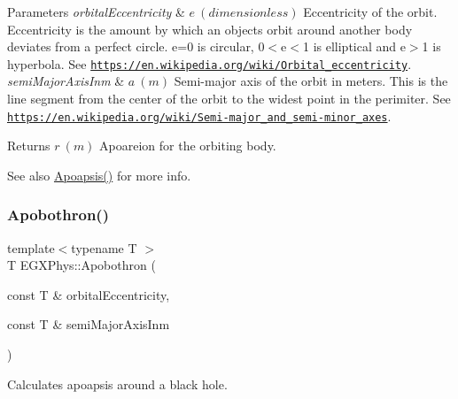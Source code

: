 \begin{DoxyParams}{Parameters}
{\em orbital\+Eccentricity} & $ e\ (dimensionless)$ Eccentricity of the orbit. Eccentricity is the amount by which an objects orbit around another body deviates from a perfect circle. e=0 is circular, 0$<$e$<$1 is elliptical and e$>$1 is hyperbola. See \href{https://en.wikipedia.org/wiki/Orbital_eccentricity}{\tt https\+://en.\+wikipedia.\+org/wiki/\+Orbital\+\_\+eccentricity}. \\
\hline
{\em semi\+Major\+Axis\+Inm} & $ a\ (m)$ Semi-\/major axis of the orbit in meters. This is the line segment from the center of the orbit to the widest point in the perimiter. See \href{https://en.wikipedia.org/wiki/Semi-major_and_semi-minor_axes}{\tt https\+://en.\+wikipedia.\+org/wiki/\+Semi-\/major\+\_\+and\+\_\+semi-\/minor\+\_\+axes}. \\
\hline
\end{DoxyParams}
\begin{DoxyReturn}{Returns}
$ r\ (m)$ Apoareion for the orbiting body. 
\end{DoxyReturn}
\begin{DoxySeeAlso}{See also}
\mbox{\hyperlink{group___e_g_x_phys-_apoapsis_gafd08a2d1d64886e7bb9bcb7ff65bc3ea}{Apoapsis()}} for more info. 
\end{DoxySeeAlso}
\mbox{\label{group___e_g_x_phys-_apoapsis_ga95add3a7ff4e799bff0a508c9bdaa408}} 
\subsubsection{\texorpdfstring{Apobothron()}{Apobothron()}}
{\footnotesize\ttfamily template$<$typename T $>$ \\
T E\+G\+X\+Phys\+::\+Apobothron (\begin{DoxyParamCaption}\item[{const T \&}]{orbital\+Eccentricity,  }\item[{const T \&}]{semi\+Major\+Axis\+Inm }\end{DoxyParamCaption})}



Calculates apoapsis around a black hole. 



